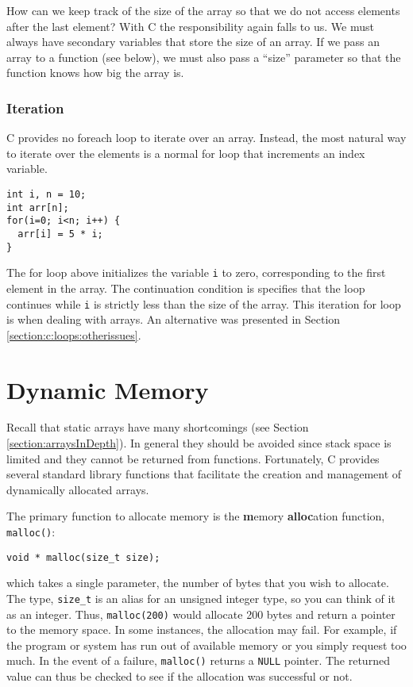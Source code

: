 How can we keep track of the size
of the array so that we do not access elements after the last
element?  With C the responsibility again falls to us.  We must
always have secondary variables that store the size of an 
array.  If we pass an array to a function (see
below), we must also pass a ``size'' parameter so that the
function knows how big the array is.

\subsubsection{Iteration}

C provides no foreach loop to iterate over an array.  Instead,
the most natural way to iterate over the elements is a normal
for loop that increments an index variable.

\begin{verbatim}
int i, n = 10;
int arr[n];
for(i=0; i<n; i++) {
  arr[i] = 5 * i;
}
\end{verbatim}

The for loop above initializes the variable \texttt{i} to zero,
corresponding to the first element in the array.  The continuation
condition is specifies that the loop continues while \texttt{i}
is strictly less than the size of the array.  This iteration for loop
is  when dealing with arrays.  An alternative
was presented in Section \ref{section:c:loops:otherissues}.

\section{Dynamic Memory}

Recall that static arrays have many shortcomings (see Section 
\ref{section:arraysInDepth}).  In general they should be avoided
since stack space is limited and they cannot be returned from 
functions.  Fortunately, C provides several standard library 
functions that facilitate the creation and management of 
dynamically allocated arrays.

The primary function to allocate memory is the \textbf{m}emory
\textbf{alloc}ation function, \texttt{malloc()}: 

\texttt{void * malloc(size_t size);}

which takes a single parameter, the number of bytes that you 
wish to allocate.  The type, \texttt{size_t} is an alias for
an unsigned integer type, so you can think of it as an integer.
Thus, \texttt{malloc(200)} would allocate 200 bytes and
return a pointer to the memory space.  In some instances, the
allocation may fail.  For example, if the program or system has
run out of available memory or you simply request too much.
In the event of a failure, \texttt{malloc()} returns a 
\texttt{NULL} pointer.  The returned value can thus
be checked to see if the allocation was successful or not.

